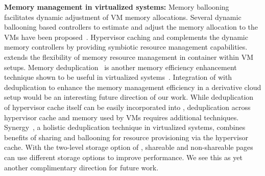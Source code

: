 \noindent
{\bf Memory management in virtualized systems:} Memory 
ballooning~\cite{vmware,hotplug} facilitates dynamic adjustment of VM memory  
allocations.
%
Several dynamic ballooning based controllers to estimate and adjust the memory 
allocation to the VMs have been proposed~\cite{wss, membal, tws}.
%
Hypervisor caching and \dd{} complements the dynamic memory controllers
by providing symbiotic resource management capabilities.
%
\dd{} extends the flexibility of memory resource management in container 
within VM setups.
%
Memory deduplication~\cite{vmware,ksmpaper,satori} is another memory
efficiency enhancement technique shown to be useful in virtualized
systems~\cite{ksmpaper,utc}.   
%
Integration of \dd{} with deduplication to enhance the memory management
efficiency in a derivative cloud setup would be an interesting future
direction of our work.
%
While deduplication of hypervisor cache itself can be easily incorporated
into \dd{}, deduplication across hypervisor cache and memory used by VMs requires
additional techniques.
%
Synergy~\cite{synergy}, a holistic deduplication technique in virtualized systems,
combines benefits of sharing and ballooning for resource provisioning
via the hypervisor cache. 
%
With the two-level storage option of \dd{}, 
shareable and non-shareable pages can use different storage options
to improve performance. We see this as yet another complimentary 
direction for future work.
%
%

